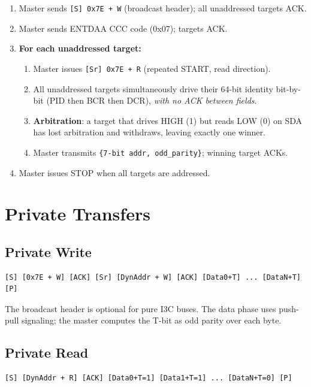 \documentclass[12pt, a4paper, oneside]{report}
\begin{document}
\begin{enumerate}
  \item Master sends \lstinline[style=plain]{[S] 0x7E + W} (broadcast header);
        all unaddressed targets ACK.
  \item Master sends ENTDAA CCC code (0x07); targets ACK.
  \item \textbf{For each unaddressed target:}
    \begin{enumerate}
      \item Master issues \lstinline[style=plain]{[Sr] 0x7E + R} (repeated START,
            read direction).
      \item All unaddressed targets simultaneously drive their 64-bit identity bit-by-bit
            (PID then BCR then DCR), \emph{with no ACK between fields}.
      \item \textbf{Arbitration}: a target that drives HIGH (1) but reads LOW (0) on
            SDA has lost arbitration and withdraws, leaving exactly one winner.
      \item Master transmits \lstinline[style=plain]|{7-bit addr, odd_parity}|;
            winning target ACKs.
    \end{enumerate}
  \item Master issues STOP when all targets are addressed.
\end{enumerate}

\section{Private Transfers}

\subsection{Private Write}

\begin{lstlisting}[style=plain, caption={I3C private write frame}]
[S] [0x7E + W] [ACK] [Sr] [DynAddr + W] [ACK] [Data0+T] ... [DataN+T] [P]
\end{lstlisting}

The broadcast header is optional for pure I3C buses. The data phase uses push-pull
signaling; the master computes the T-bit as odd parity over each byte.

\subsection{Private Read}

\begin{lstlisting}[style=plain, caption={I3C private read frame}]
[S] [DynAddr + R] [ACK] [Data0+T=1] [Data1+T=1] ... [DataN+T=0] [P]
\end{lstlisting}
\end{document}

